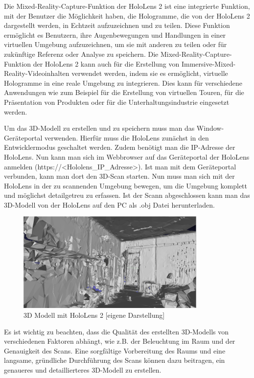         Die Mixed-Reality-Capture-Funktion der HoloLens 2 ist eine integrierte Funktion, mit der Benutzer die Möglichkeit haben, die Hologramme, die von der HoloLens 2 dargestellt werden, in Echtzeit aufzuzeichnen und zu teilen. Diese Funktion ermöglicht es Benutzern, ihre Augenbewegungen und Handlungen in einer virtuellen Umgebung aufzuzeichnen, um sie mit anderen zu teilen oder für zukünftige Referenz oder Analyse zu speichern. Die Mixed-Reality-Capture-Funktion der HoloLens 2 kann auch für die Erstellung von Immersive-Mixed-Reality-Videoinhalten verwendet werden, indem sie es ermöglicht, virtuelle Hologramme in eine reale Umgebung zu integrieren. Dies kann für verschiedene Anwendungen wie zum Beispiel für die Erstellung von virtuellen Touren, für die Präsentation von Produkten oder für die Unterhaltungsindustrie eingesetzt werden.

        Um das 3D-Modell zu erstellen und zu speichern muss man das Window-Geräteportal verwenden. Hierfür muss die HoloLens zunächst in den Entwicklermodus geschaltet werden. Zudem benötigt man die IP-Adresse der HoloLens. Nun kann man sich im Webbrowser auf das Geräteportal der HoloLens anmelden (https://<Hololens\_IP\_Adresse>). Ist man mit dem Geräteportal verbunden, kann man dort den 3D-Scan starten. Nun muss man sich mit der HoloLens in der zu scannenden Umgebung bewegen, um die Umgebung komplett und möglichst detailgetreu zu erfassen. Ist der Scann abgeschlossen kann man das 3D-Modell von der HoloLens auf den PC als .obj Datei herunterladen.

        \begin{figure}[H]
            \centering
            \includegraphics[scale=1]{images/modell_zimmer_hololens.png}
            \caption[3D Modell mit HoloLens 2]{\label{img modell_hololens} 3D Modell mit HoloLens 2 [eigene Darstellung]}
        \end{figure}

        Es ist wichtig zu beachten, dass die Qualität des erstellten 3D-Modells von verschiedenen Faktoren abhängt, wie z.B. der Beleuchtung im Raum und der Genauigkeit des Scans. Eine sorgfältige Vorbereitung des Raums und eine langsame, gründliche Durchführung des Scans können dazu beitragen, ein genaueres und detaillierteres 3D-Modell zu erstellen.
